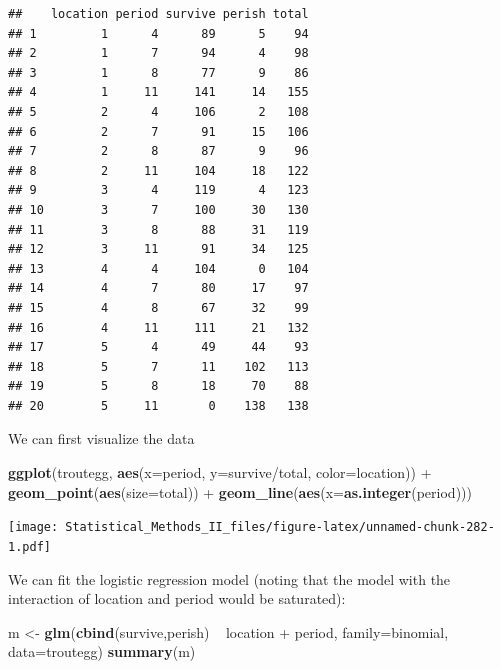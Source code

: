 \documentclass[]{book}
\newenvironment{Shaded}{\begin{snugshade}}{\end{snugshade}}
\newcommand{\KeywordTok}[1]{\textcolor[rgb]{0.13,0.29,0.53}{\textbf{{#1}}}}
\newcommand{\DataTypeTok}[1]{\textcolor[rgb]{0.13,0.29,0.53}{{#1}}}
\newcommand{\StringTok}[1]{\textcolor[rgb]{0.31,0.60,0.02}{{#1}}}
\newcommand{\NormalTok}[1]{{#1}}
\theoremstyle{definition}
\theoremstyle{definition}
\theoremstyle{remark}
\begin{document}
\begin{verbatim}
##    location period survive perish total
## 1         1      4      89      5    94
## 2         1      7      94      4    98
## 3         1      8      77      9    86
## 4         1     11     141     14   155
## 5         2      4     106      2   108
## 6         2      7      91     15   106
## 7         2      8      87      9    96
## 8         2     11     104     18   122
## 9         3      4     119      4   123
## 10        3      7     100     30   130
## 11        3      8      88     31   119
## 12        3     11      91     34   125
## 13        4      4     104      0   104
## 14        4      7      80     17    97
## 15        4      8      67     32    99
## 16        4     11     111     21   132
## 17        5      4      49     44    93
## 18        5      7      11    102   113
## 19        5      8      18     70    88
## 20        5     11       0    138   138
\end{verbatim}

We can first visualize the data

\begin{Shaded}
\begin{Highlighting}[]
\KeywordTok{ggplot}\NormalTok{(troutegg, }\KeywordTok{aes}\NormalTok{(}\DataTypeTok{x=}\NormalTok{period, }\DataTypeTok{y=}\NormalTok{survive/total, }\DataTypeTok{color=}\NormalTok{location)) +}\StringTok{    }
\StringTok{  }\KeywordTok{geom_point}\NormalTok{(}\KeywordTok{aes}\NormalTok{(}\DataTypeTok{size=}\NormalTok{total)) +}\StringTok{    }
\StringTok{  }\KeywordTok{geom_line}\NormalTok{(}\KeywordTok{aes}\NormalTok{(}\DataTypeTok{x=}\KeywordTok{as.integer}\NormalTok{(period)))}
\end{Highlighting}
\end{Shaded}

\texttt{[image: Statistical\_Methods\_II\_files/figure-latex/unnamed-chunk-282-1.pdf]}

We can fit the logistic regression model (noting that the model with the
interaction of location and period would be saturated):

\begin{Shaded}
\begin{Highlighting}[]
\NormalTok{m <-}\StringTok{ }\KeywordTok{glm}\NormalTok{(}\KeywordTok{cbind}\NormalTok{(survive,perish) ~}\StringTok{ }\NormalTok{location +}\StringTok{ }\NormalTok{period, }\DataTypeTok{family=}\NormalTok{binomial, }\DataTypeTok{data=}\NormalTok{troutegg)}
\KeywordTok{summary}\NormalTok{(m)}
\end{Highlighting}
\end{Shaded}
\end{document}
